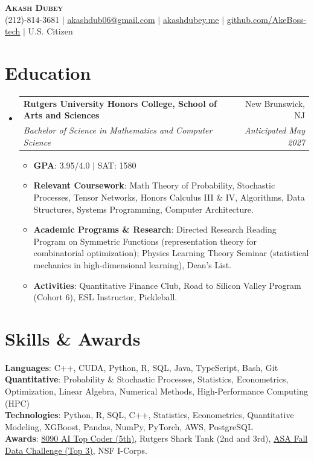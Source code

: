 \documentclass[letterpaper,11pt]{article}
\makeatletter
\newcommand{\resumeItem}[1]{
  \item\small{
    {#1 \vspace{-2pt}}
  }
}
\newcommand{\resumeSubheading}[4]{
  \vspace{-2pt}\item
    \begin{tabular*}{0.97\textwidth}[t]{l@{\extracolsep{\fill}}r}
      \textbf{#1} & #2 \\
      \textit{\small#3} & \textit{\small #4} \\
    \end{tabular*}\vspace{-7pt}
}
\newcommand{\resumeSubHeadingListStart}{\begin{itemize}[leftmargin=0.15in, label={}]}
\newcommand{\resumeSubHeadingListEnd}{\end{itemize}}
\newcommand{\resumeItemListStart}{\begin{itemize}}
\newcommand{\resumeItemListEnd}{\end{itemize}\vspace{-5pt}}
\makeatother
\begin{document}
\begin{center}
    \textbf{\Huge \scshape Akash Dubey} \\ \vspace{1pt}
    \small (212)-814-3681 $|$ \href{mailto:akashdub06@gmail.com}{\underline{akashdub06@gmail.com}} $|$
    \href{https://akashdubey.me/}{\underline{akashdubey.me}} $|$
    \href{https://github.com/AkeBoss-tech}{\underline{github.com/AkeBoss-tech}} $|$
    \small U.S. Citizen
\end{center}
\section{Education}
  \resumeSubHeadingListStart
    \resumeSubheading
      {Rutgers University Honors College, School of Arts and Sciences}{New Brunswick, NJ}
      {Bachelor of Science in Mathematics and Computer Science}{Anticipated May 2027}
      \resumeItemListStart
        \resumeItem{\textbf{GPA}: 3.95/4.0 $|$ SAT: 1580}
        \resumeItem{\textbf{Relevant Coursework}: Math Theory of Probability, Stochastic Processes, Tensor Networks, Honors Calculus III \& IV, Algorithms, Data Structures, Systems Programming, Computer Architecture.}
        \resumeItem{\textbf{Academic Programs \& Research}: Directed Research Reading Program on Symmetric Functions (representation theory for combinatorial optimization); Physics Learning Theory Seminar (statistical mechanics in high-dimensional learning), Dean's List.}
        \resumeItem{\textbf{Activities}: Quantitative Finance Club, Road to Silicon Valley Program (Cohort 6), ESL Instructor, Pickleball.}
      \resumeItemListEnd
  \resumeSubHeadingListEnd
\section{Skills \& Awards}
 \begin{itemize}[leftmargin=0.15in, label={}]
    \small{\item{
     \textbf{Languages}{: C++, CUDA, Python, R, SQL, Java, TypeScript, Bash, Git} \\
     \textbf{Quantitative}{: Probability \& Stochastic Processes, Statistics, Econometrics, Optimization, Linear Algebra, Numerical Methods, High-Performance Computing (HPC)} \\
     \textbf{Technologies}{: Python, R, SQL, C++, Statistics, Econometrics, Quantitative Modeling, XGBoost, Pandas, NumPy, PyTorch, AWS, PostgreSQL} \\
     \textbf{Awards}{: \href{https://github.com/AkeBoss-tech/top-coder-challenge}{8090 AI Top Coder (5th)}, Rutgers Shark Tank (2nd and 3rd), \href{https://acashmoney.biz/portfolio/asa-fall-data/}{ASA Fall Data Challenge (Top 3)}, NSF I-Corps.}
    }}
 \end{itemize}
\end{document}
